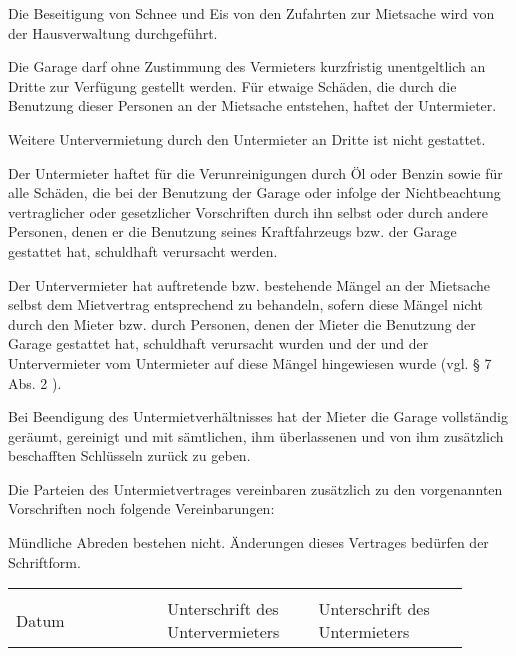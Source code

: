 \documentclass[a4paper]{scrartcl}
\begin{document}

Die Beseitigung von Schnee und Eis von den Zufahrten zur Mietsache wird von der Hausverwaltung durchgeführt.



Die Garage darf ohne Zustimmung des Vermieters kurzfristig unentgeltlich an Dritte zur Verfügung gestellt werden. Für etwaige Schäden, die durch die Benutzung dieser Personen an der Mietsache entstehen, haftet der Untermieter.
\vspace{3mm}

\noindent
Weitere Untervermietung durch den Untermieter an Dritte ist nicht gestattet.



Der Untermieter haftet für die Verunreinigungen durch Öl oder Benzin sowie für alle Schäden, die bei der Benutzung
der Garage oder infolge der Nichtbeachtung vertraglicher oder gesetzlicher Vorschriften durch ihn selbst oder durch 
andere Personen, denen er die Benutzung seines Kraftfahrzeugs bzw. der Garage gestattet hat, schuldhaft verursacht 
werden.



Der Untervermieter hat auftretende bzw. bestehende Mängel an der Mietsache selbst dem Mietvertrag entsprechend
zu behandeln, sofern diese Mängel nicht durch den Mieter bzw. durch Personen, denen der Mieter die Benutzung der
Garage gestattet hat, schuldhaft verursacht wurden und der und der Untervermieter vom Untermieter auf diese Mängel
hingewiesen wurde (vgl. § 7 Abs. 2 ).



Bei Beendigung des Untermietverhältnisses hat der Mieter die Garage vollständig geräumt, gereinigt und mit sämtlichen,
ihm überlassenen und von ihm zusätzlich beschafften Schlüsseln zurück zu geben.



Die Parteien des Untermietvertrages vereinbaren zusätzlich zu den vorgenannten Vorschriften noch folgende
Vereinbarungen: \vspace{5cm}



Mündliche Abreden bestehen nicht. Änderungen dieses Vertrages bedürfen der Schriftform.

\vspace{4cm}

\parnumberfalse
\noindent
\begin{tabular}{p{0.3\linewidth}p{0.3\linewidth}p{0.3\linewidth}}
	\hrulefill&\hrulefill&\hrulefill\\
	\scriptsize Datum&{\scriptsize Unterschrift des Untervermieters}&{\scriptsize Unterschrift des Untermieters}
\end{tabular}


	
\end{document}
